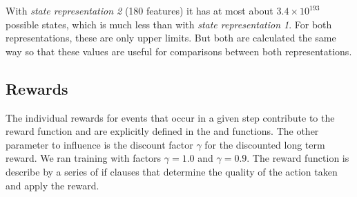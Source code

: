 	With \textit{state representation 2} (180 features) it has at most about $3.4 \times 10^{193}$ possible states, which is much less than with \textit{state representation 1}. For both representations, these are only upper limits. But both are calculated the same way so that these values are useful for comparisons between both representations.
	
	\subsection{Rewards}
	The individual rewards for events that occur in a given step contribute to the reward function and are explicitly defined in the  and  functions. The other parameter to influence is the discount factor $\gamma$ for the discounted long term reward. We ran training with factors $\gamma = 1.0$ and $\gamma = 0.9$. The reward function is describe by a series of if clauses that determine the quality of the action taken and apply the reward.
